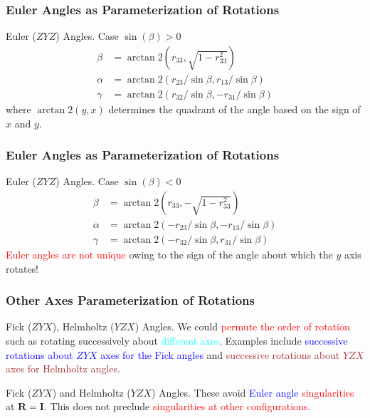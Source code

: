 \begin{frame}
	\frametitle{Euler Angles as Parameterization of Rotations}
	\begin{block}{Euler ($ZYZ$) Angles. Case $\sin(\beta)>0$}
	\begin{subequations}
		\begin{align}
			\beta &= \arctan 2(r_{33}, \sqrt{1 - r_{33}^2})  \label{eq:euler_a}\\
			\alpha &= \arctan 2(r_{23}/\sin \beta, r_{13}/\sin \beta) \label{eq:euler_b} \\
			\gamma &= \arctan 2 (r_{32}/\sin \beta, -r_{31}/\sin \beta)
		\end{align}
		\label{eq:euler}
	\end{subequations}
	\footnotesize{where $\arctan2(y, x)$ determines the quadrant of the angle based on the sign of $x$ and $y$}.
	\end{block}
\end{frame}

\begin{frame}
	\frametitle{Euler Angles as Parameterization of Rotations}
	\begin{block}{Euler ($ZYZ$) Angles. Case $\sin(\beta)<0$}
	\begin{subequations}
		\begin{align}
			\beta &=  \arctan2(r_{33}, -\sqrt{1 - r_{33}^2})  \label{eq:euler_neg_a}\\
			\alpha &= \arctan 2(-r_{23}/\sin \beta, -r_{13}/\sin \beta) \label{eq:euler_neg_b} \\
			\gamma &= \arctan 2 (-r_{32}/\sin \beta, r_{31}/\sin \beta)
		\end{align}
		\label{eq:euler_neg}
	\end{subequations}
		\footnotesize{\textcolor{red}{Euler angles are not unique} owing to the sign of the angle about which the $y$ axis rotates!}
	\end{block}
\end{frame}


\begin{frame}
	\frametitle{Other Axes Parameterization of Rotations}
	\begin{block}{Fick ($ZYX$), Helmholtz ($YZX$) Angles.}
		 We could \textcolor{red}{permute the order of rotation} such as rotating successively about \textcolor{cyan}{different axes}. Examples include \textcolor{blue}{successive rotations about $ZYX$ axes for the Fick angles} and \textcolor{brown}{successive rotations about $YZX$ axes for Helmholtz angles}.
	\end{block}
	
	\begin{block}{Fick ($ZYX$) and Helmholtz ($YZX$) Angles.}
		These avoid \textcolor{blue}{Euler angle} \textcolor{red}{singularities} at $\bm{R} = \bm{I}$. This does not preclude \textcolor{red}{singularities at other configurations}.
	\end{block}
\end{frame}



